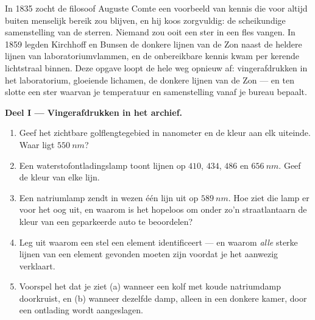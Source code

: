 \begin{problem}
\label{pb:g10:light-spectra:1}
In 1835 zocht de filosoof Auguste Comte een voorbeeld van kennis die voor
altijd buiten menselijk bereik zou blijven, en hij koos zorgvuldig: de
scheikundige samenstelling van de sterren. Niemand zou ooit een ster in
een fles vangen. In 1859 legden Kirchhoff en Bunsen de donkere lijnen van
de Zon naast de heldere lijnen van laboratoriumvlammen, en de
onbereikbare kennis kwam per kerende lichtstraal binnen. Deze opgave
loopt de hele weg opnieuw af: vingerafdrukken in het laboratorium,
gloeiende lichamen, de donkere lijnen van de Zon --- en ten slotte een
ster waarvan je temperatuur en samenstelling vanaf je bureau bepaalt.

\medskip
\noindent\textbf{Deel I --- Vingerafdrukken in het archief.}
\begin{enumerate}
  \item Geef het zichtbare golflengtegebied in nanometer en de kleur aan
        elk uiteinde. Waar ligt $\qty{550}{nm}$?
  \item Een waterstofontladingslamp toont lijnen op $410$, $434$, $486$
        en $\qty{656}{nm}$. Geef de kleur van elke lijn.
  \item Een natriumlamp zendt in wezen één lijn uit op $\qty{589}{nm}$.
        Hoe ziet die lamp er voor het oog uit, en waarom is het
        hopeloos om onder zo'n straatlantaarn de kleur van een geparkeerde
        auto te beoordelen?
  \item Leg uit waarom een stel  een element identificeert
        --- en waarom \emph{alle} sterke lijnen van een element gevonden
        moeten zijn voordat je het aanwezig verklaart.
  \item Voorspel het  dat je ziet (a) wanneer  een kolf
        met koude natriumdamp doorkruist, en (b) wanneer dezelfde damp,
        alleen in een donkere kamer, door een ontlading wordt
        aangeslagen.
\end{enumerate}


\end{problem}
